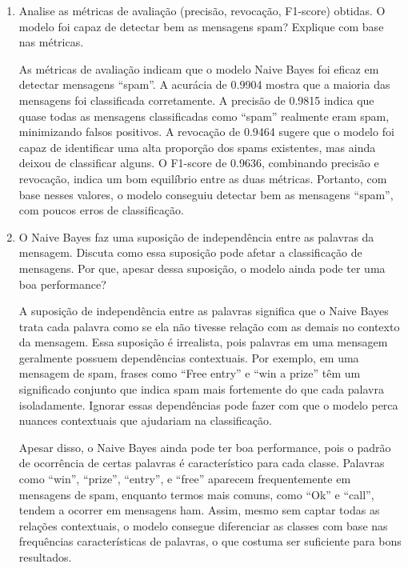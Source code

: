 \begin{enumerate}
    \item Analise as métricas de avaliação (precisão, revocação, F1-score) obtidas. O modelo foi capaz de detectar bem as mensagens spam? Explique com base nas métricas.
    \begin{tcolorbox}[title=Resposta:]
        As métricas de avaliação indicam que o modelo Naive Bayes foi eficaz em detectar mensagens ``spam''. A acurácia de 0.9904 mostra que a maioria das mensagens foi classificada corretamente. A precisão de 0.9815 indica que quase todas as mensagens classificadas como ``spam'' realmente eram spam, minimizando falsos positivos. A revocação de 0.9464 sugere que o modelo foi capaz de identificar uma alta proporção dos spams existentes, mas ainda deixou de classificar alguns. O F1-score de 0.9636, combinando precisão e revocação, indica um bom equilíbrio entre as duas métricas. Portanto, com base nesses valores, o modelo conseguiu detectar bem as mensagens ``spam'', com poucos erros de classificação.
        \end{tcolorbox}
        
    \newpage
    \item O Naive Bayes faz uma suposição de independência entre as palavras da mensagem. Discuta como essa suposição pode afetar a classificação de mensagens. Por que, apesar dessa suposição, o modelo ainda pode ter uma boa performance?
    \begin{tcolorbox}[title=Resposta:]
        A suposição de independência entre as palavras significa que o Naive Bayes trata cada palavra como se ela não tivesse relação com as demais no contexto da mensagem. Essa suposição é irrealista, pois palavras em uma mensagem geralmente possuem dependências contextuais. Por exemplo, em uma mensagem de spam, frases como ``Free entry'' e ``win a prize'' têm um significado conjunto que indica spam mais fortemente do que cada palavra isoladamente. Ignorar essas dependências pode fazer com que o modelo perca nuances contextuais que ajudariam na classificação.
        
        Apesar disso, o Naive Bayes ainda pode ter boa performance, pois o padrão de ocorrência de certas palavras é característico para cada classe. Palavras como ``win'', ``prize'', ``entry'', e ``free'' aparecem frequentemente em mensagens de spam, enquanto termos mais comuns, como ``Ok'' e ``call'', tendem a ocorrer em mensagens ham. Assim, mesmo sem captar todas as relações contextuais, o modelo consegue diferenciar as classes com base nas frequências características de palavras, o que costuma ser suficiente para bons resultados.
        \end{tcolorbox}
        

\end{enumerate}
